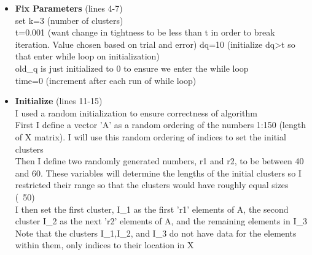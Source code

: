 \documentclass{article}
\begin{document}
\begin{itemize}
    \item \textbf{Fix Parameters} (lines 4-7) \\
    set k=3 (number of clusters) \\
    t=0.001 (want change in tightness to be less than t in order to break iteration.  Value chosen based on trial and error)
    dq=10 (initialize dq>t so that enter while loop on initialization) \\
    old\_q is just initialized to 0 to ensure we enter the while loop  \\
    time=0 (increment after each run of while loop)
    
    \item \textbf{Initialize} (lines 11-15)\\
    I used a random initialization to ensure correctness of algorithm \\
    First I define a vector 'A' as a random ordering of the numbers 1:150 (length of X matrix). I will use this random ordering of indices to set the initial clusters \\
    Then I define two randomly generated numbers, r1 and r2, to be between 40 and 60.  These variables will determine the lengths of the initial clusters so I restricted their range so that the clusters would have roughly equal sizes (~50)\\
    I then set the first cluster, I\_1 as the first 'r1' elements of A, the second cluster I\_2 as the next 'r2' elements of A, and the remaining elements in I\_3
    Note that the clusters I\_1,I\_2, and I\_3 do not have data for the elements within them, only indices to their location in X
    

\end{itemize}
\end{document}
